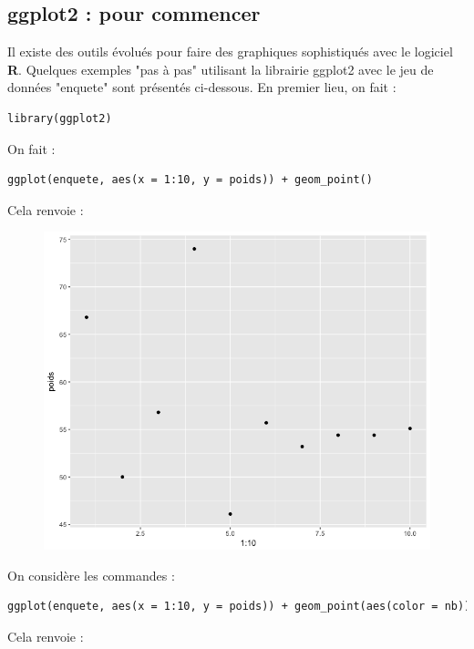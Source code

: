 \subsection{ggplot2 : pour commencer}
Il existe des outils évolués pour faire des graphiques sophistiqués avec le logiciel \textbf{R}.\newline
Quelques exemples "pas à pas" utilisant la librairie ggplot2 avec le jeu de données "enquete" sont présentés ci-dessous.\newline
En premier lieu, on fait :
\begin{lstlisting}[language=html]
library(ggplot2)
\end{lstlisting}
On fait :
\begin{lstlisting}[language=html]
ggplot(enquete, aes(x = 1:10, y = poids)) + geom_point()
\end{lstlisting}
Cela renvoie :
\begin{figure}[H]\begin{center}\includegraphics[scale=0.4]{ilu/gra71.png}\end{center}\end{figure}
On considère les commandes :
\begin{lstlisting}[language=html]
ggplot(enquete, aes(x = 1:10, y = poids)) + geom_point(aes(color = nb))
\end{lstlisting}
Cela renvoie :
